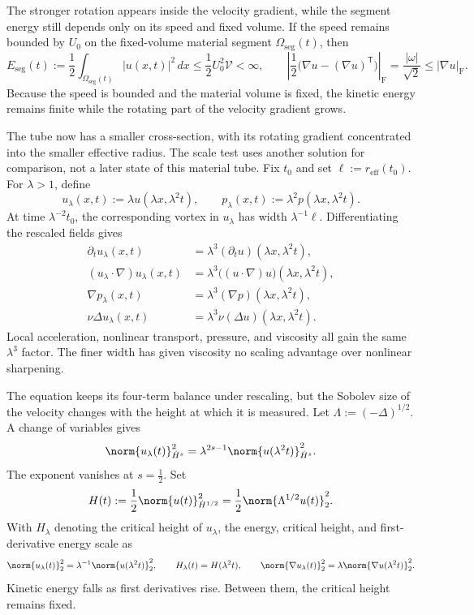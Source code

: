 The stronger rotation appears inside the velocity gradient, while the segment energy still depends only on its speed and fixed volume.
If the speed remains bounded by \(U_0\) on the fixed-volume material segment \(\Omega_{\mathrm{seg}}(t)\), then
\[
  E_{\mathrm{seg}}(t)
  :=
  \frac12\int_{\Omega_{\mathrm{seg}}(t)}|u(x,t)|^2\,dx
  \leq
  \frac12U_0^2\mathcal V
  <
  \infty,
  \qquad
  \left|\frac12\bigl(\nabla u-(\nabla u)^{\mathsf T}\bigr)\right|_{\mathrm F}
  =
  \frac{|\omega|}{\sqrt2}
  \leq
  |\nabla u|_{\mathrm F}.
\]
Because the speed is bounded and the material volume is fixed, the kinetic energy remains finite while the rotating part of the velocity gradient grows.


The tube now has a smaller cross-section, with its rotating gradient concentrated into the smaller effective radius.
The scale test uses another solution for comparison, not a later state of this material tube.
Fix \(t_0\) and set \(\ell:=r_{\mathrm{eff}}(t_0)\).
For \(\lambda>1\), define
\[
  u_\lambda(x,t)
  :=
  \lambda u(\lambda x,\lambda^2t),
  \qquad
  p_\lambda(x,t)
  :=
  \lambda^2p(\lambda x,\lambda^2t).
\]
At time \(\lambda^{-2}t_0\), the corresponding vortex in \(u_\lambda\) has width \(\lambda^{-1}\ell\).
Differentiating the rescaled fields gives
\[
\begin{aligned}
  \partial_tu_\lambda(x,t)
  &=
  \lambda^3(\partial_tu)(\lambda x,\lambda^2t),
  \\
  (u_\lambda\cdot\nabla)u_\lambda(x,t)
  &=
  \lambda^3\bigl((u\cdot\nabla)u\bigr)(\lambda x,\lambda^2t),
  \\
  \nabla p_\lambda(x,t)
  &=
  \lambda^3(\nabla p)(\lambda x,\lambda^2t),
  \\
  \nu\Delta u_\lambda(x,t)
  &=
  \lambda^3\nu(\Delta u)(\lambda x,\lambda^2t).
\end{aligned}
\]
Local acceleration, nonlinear transport, pressure, and viscosity all gain the same \(\lambda^3\) factor.
The finer width has given viscosity no scaling advantage over nonlinear sharpening.


The equation keeps its four-term balance under rescaling, but the Sobolev size of the velocity changes with the height at which it is measured.
Let \(\Lambda:=(-\Delta)^{1/2}\).
A change of variables gives
\[
  \norm{u_\lambda(t)}_{\dot H^s}^2
  =
  \lambda^{2s-1}
  \norm{u(\lambda^2t)}_{\dot H^s}^2.
\]
The exponent vanishes at \(s=\tfrac12\).
Set
\[
  H(t)
  :=
  \frac12\norm{u(t)}_{\dot H^{1/2}}^2
  =
  \frac12\norm{\Lambda^{1/2}u(t)}_2^2.
\]
With \(H_\lambda\) denoting the critical height of \(u_\lambda\), the energy, critical height, and first-derivative energy scale as
\[
  \norm{u_\lambda(t)}_2^2
  =
  \lambda^{-1}\norm{u(\lambda^2t)}_2^2,
  \qquad
  H_\lambda(t)=H(\lambda^2t),
  \qquad
  \norm{\nabla u_\lambda(t)}_2^2
  =
  \lambda\norm{\nabla u(\lambda^2t)}_2^2.
\]
Kinetic energy falls as first derivatives rise.
Between them, the critical height remains fixed.


